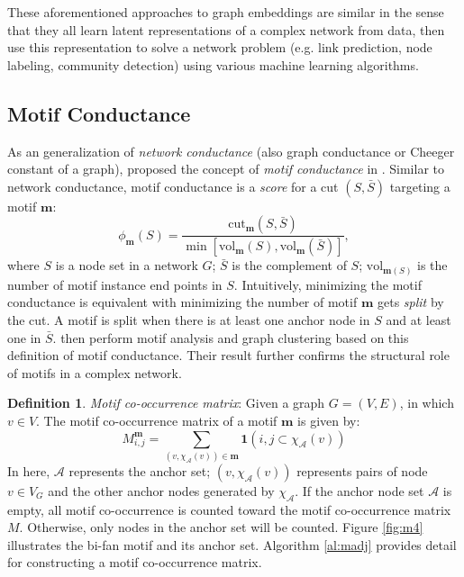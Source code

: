\documentclass{article}
\theoremstyle{definition}
\newtheorem{definition}{Definition}[section]
\begin{document}
These aforementioned approaches to graph embeddings
are similar in the sense that they all learn latent representations
of a complex network from data, then use this representation to solve 
a network problem (e.g. link prediction, node labeling, community
detection) using various machine learning algorithms.

\subsection{Motif Conductance}

As an generalization of \emph{network conductance} (also graph conductance 
or Cheeger constant of a graph), \citeauthor{juremotif} proposed
the concept of \emph{motif conductance} in \cite{juremotif}. Similar to
network conductance, motif conductance is a \emph{score} for a cut 
$(S, \bar{S})$ targeting a motif $\mathbf{m}$:
\begin{equation*}
	\phi_{\mathbf{m}}(S) = \frac{\mbox{cut}_{\mathbf{m}}(S,\bar{S})}{\min[\mbox{vol}_{\mathbf{m}}(S), \mbox{vol}_{\mathbf{m}}(\bar{S})]},
\end{equation*}
where $S$ is a node set in a network $G$; $\bar{S}$ is the complement
of $S$; $\mbox{vol}_{\mathbf{m}(S)}$ is the number of motif instance
end points in $S$. Intuitively, minimizing the motif conductance is
equivalent with minimizing the number of motif $\mathbf{m}$ gets 
\emph{split} by the cut. A motif is split when there is at least one
anchor node in $S$ and at least one in $\bar{S}$. \citeauthor{juremotif}
then perform motif analysis and graph clustering based on this
definition of motif conductance. Their result further confirms the
structural role of motifs in a complex network. 

\begin{definition} \emph{Motif co-occurrence matrix}:
Given a graph $G = (V,E)$, in which $v \in V$. The motif co-occurrence 
matrix of a motif $\mathbf{m}$ is given by:
$$M_{i,j}^{\mathbf{m}} = \sum_{(v, \chi_{\mathcal{A}}(v)) \in \mathbf{m}} \mathbf{1}({i,j} \subset \chi_\mathcal{A}(v))$$
In here, $\mathcal{A}$ represents the anchor set; 
$(v, \chi_{\mathcal{A}}(v))$ represents pairs of node $v \in V_G$ and the 
other anchor nodes generated by $\chi_\mathcal{A}$. If the anchor node set 
$\mathcal{A}$ is empty, all motif co-occurrence is counted toward the 
motif co-occurrence matrix $M$. Otherwise, only nodes in the anchor set 
will be counted. Figure \ref{fig:m4} illustrates the bi-fan motif and 
its anchor set. Algorithm \ref{al:madj} provides detail for constructing
a motif co-occurrence matrix.
\end{definition}
\end{document}
